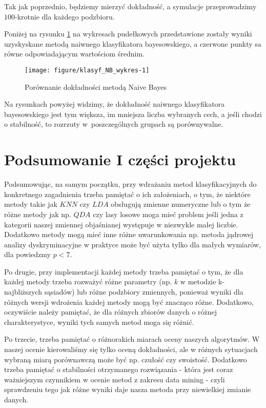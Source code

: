 \documentclass[12pt, a4paper]{article}\usepackage[]{graphicx}\usepackage[]{xcolor}
\makeatletter
\def\maxwidth{ %
  \ifdim\Gin@nat@width>\linewidth
    \linewidth
  \else
    \Gin@nat@width
  \fi
}
\newenvironment{knitrout}{}{} %
\makeatother
\begin{document}
Tak jak poprzednio, będziemy mierzyć dokładność, a symulacje przeprowadzimy $100$-krotnie dla każdego podzbioru.


\par
Poniżej na rysunku \ref{fig:klasyf_NB_wykres} na wykresach pudełkowych przedstawione zostały wyniki uzyskyskane metodą naiwnego klasyfikatora bayesowskiego, a czerwone punkty sa równe odpowiadającym wartościom średnim.
\begin{knitrout}
\color{fgcolor}\begin{figure}[H]

{\centering \texttt{[image: figure/klasyf\_NB\_wykres-1]} 

}

\caption[Porównanie dokładności metodą Naive Bayes]{Porównanie dokładności metodą Naive Bayes}\label{fig:klasyf_NB_wykres}
\end{figure}

\end{knitrout}

Na rysunkach powyżej widzimy, że dokładność naiwnego klasyfikatora bayesowskiego jest tym większa, im mniejsza liczba wybranych cech, a jeśli chodzi o stabilność, to rozrzuty w~poszczególnych grupach są porównywalne.

\section{Podsumowanie I części projektu}
Podsumowując, na samym początku, przy wdrażaniu metod klasyfikacyjnych do konkretnego zagadnienia trzeba pamiętać o ich założeniach, o tym, że niektóre metody takie jak $KNN$ czy $LDA$ obsługują zmienne numeryczne lub o tym że różne metody jak np. $QDA$ czy lasy losowe moga mieć problem jeśli jedna z kategorii naszej zmiennej objaśnianej występuje w niezwykle małej liczbie. Dodatkowo metody mogą mieć inne różne uwarunkowania np. metoda jądrowej analizy dyskryminacyjne w praktyce może być użyta tylko dla małych wymiarów, dla powiedzmy $p<7$.
\par
Po drugie, przy implementacji każdej metody trzeba pamiętać o tym, że dla każdej metody trzeba rozważyć różne parametry (np. $k$ w metodzie k-najbliższych sąsiadów) lub różne podzbiory zmiennych, ponieważ wyniki dla różnych wersji wdrożenia każdej metody mogą być znacząco różne. Dodatkowo, oczywiście należy pamiętać, że dla różnych zbiorów danych o różnej charakterystyce, wyniki tych samych metod moga się różnić.
\par
Po trzecie, trzeba pamiętać o różnorakich miarach oceny naszych algorytmów. W naszej ocenie kierowaliśmy się tylko oceną dokładności, ale w różnych sytuacjach wybraną miarą porównawczą może być np. czułość czy swoistość. Dodatkowo trzeba pamiętać o stabilności otrzymanego rozwiązania - która jest coraz ważniejszym czynnikiem w ocenie metod z zakresu data mining - czyli sprawdzeniu tego jak różne wyniki daje nasza metoda przy niewielkiej zmianie danych.
\end{document}
